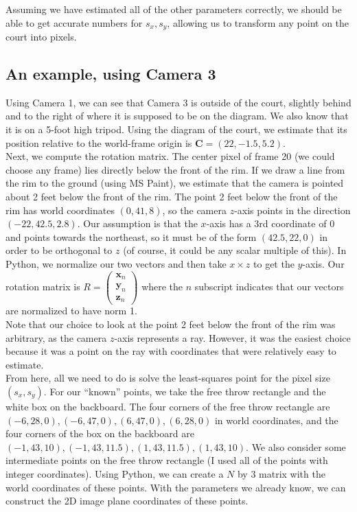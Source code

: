 \documentclass{article}
\renewcommand{\vec}[1]{\mathbf{#1}}
\begin{document}
Assuming we have estimated all of the other parameters correctly, we should be able to get accurate numbers for $s_x, s_y$, 
allowing us to transform any point on the court into pixels.

\subsection{An example, using Camera 3}
Using Camera 1, we can see that Camera 3 is outside of the court, slightly behind and to the right of where it is supposed to be on the diagram. 
We also know that it is on a 5-foot high tripod. 
Using the diagram of the court, we estimate that its position relative to the world-frame origin is $\bm{C}=(22, -1.5, 5.2)$. \\

Next, we compute the rotation matrix. The center pixel of frame 20 (we could choose any frame) lies directly below the front of the rim. 
If we draw a line from the rim to the ground (using MS Paint), we estimate that the camera is pointed about 2 feet below the front of the rim. 
The point 2 feet below the front of the rim has world coordinates $(0, 41, 8)$, so the camera $z$-axis points in the direction $(-22, 42.5, 2.8)$.
 Our assumption is that the $x$-axis has a 3rd coordinate of 0 and points towards the northeast, so it must be of the form $(42.5, 22, 0)$ 
 in order to be orthogonal to $z$ (of course, it could be any scalar multiple of this). 
 In Python, we normalize our two vectors and then take $x\times z$ to get the $y$-axis. 
 Our rotation matrix is $R=\begin{pmatrix} \vec{x}_n \\ \vec{y}_n \\ \vec{z}_n \end{pmatrix}$ where the $n$ subscript 
 indicates that our vectors are normalized to have norm 1. \\

Note that our choice to look at the point 2 feet below the front of the rim was arbitrary, as the camera $z$-axis represents a ray. 
However, it was the easiest choice because it was a point on the ray with coordinates that were relatively easy to estimate. \\

From here, all we need to do is solve the least-squares point for the pixel size $(s_x, s_y)$. 
For our ``known'' points, we take the free throw rectangle and the white box on the backboard. 
The four corners of the free throw rectangle are $(-6, 28, 0), (-6, 47, 0), (6, 47, 0), (6, 28, 0)$ in world coordinates, 
and the four corners of the box on the backboard are $(-1, 43, 10), (-1, 43, 11.5), (1, 43, 11.5), (1, 43, 10)$. 
We also consider some intermediate points on the free throw rectangle (I used all of the points with integer coordinates). 
Using Python, we can create a $N$ by 3 matrix with the world coordinates of these points. 
With the parameters we already know, we can construct the 2D image plane coordinates of these points. \\
\end{document}
